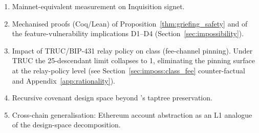 \begin{enumerate}
  \item Mainnet-equivalent measurement on Inquisition signet.
  \item Mechanised proofs (Coq/Lean) of
    Proposition~\ref{thm:griefing_safety} and of the
    feature-vulnerability implications D1--D4
    (Section~\ref{sec:impossibility}).
  \item Impact of TRUC/BIP-431 relay policy on class \classfee{}
    (fee-channel pinning). Under TRUC the 25-descendant limit
    collapses to 1, eliminating the pinning surface at the
    relay-policy level (see Section~\ref{sec:imposs:class_fee}
    counter-factual and Appendix~\ref{app:rationality}).
  \item Recursive covenant design space beyond \opccv{}'s taptree
    preservation.
  \item Cross-chain generalisation: Ethereum account abstraction as
    an L1 analogue of the design-space decomposition.
\end{enumerate}

\providecommand{\todo}[2][]{\textbf{[TODO: #2]}}
